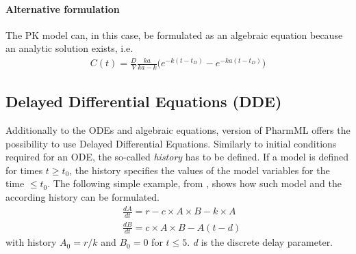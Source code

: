 \paragraph{Alternative formulation}
The PK model can, in this case, be formulated as an algebraic equation because an analytic solution exists, i.e.
\begin{align*}
C(t) = \frac{D}{V}  \frac{ka}{ka - k} \Big(e^{-k(t-t_D)} - e^{-ka(t-t_D)} \Big) 
\end{align*}

\subsection{Delayed Differential Equations (DDE)} %
Additionally to the ODEs and algebraic equations, version \currpml of PharmML offers
the possibility to use Delayed Differential Equations. Similarly to initial conditions required
for an ODE, the so-called \emph{history} has to be defined. If a model is defined for times
$t \geq t_0$, the history specifies the values of the model variables for the 
time $\leq t_0$. 
The following simple example, from \cite{MLXTRANforMonolix:2014}, shows how 
such model and the according history can be formulated. 
\begin{align}
& \frac{dA}{dt} = r - c \times A \times B - k \times A \nonumber \\
& \frac{dB}{dt} = c \times A \times B - A(t-d) \nonumber 
\end{align}
with history $A_0 = r/k$ and $B_0 = 0$ for $t \le 5$. \emph{d} is the discrete delay parameter.

%
%
%

